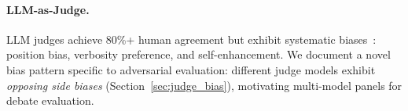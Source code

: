 \paragraph{LLM-as-Judge.}
LLM judges achieve 80\%+ human agreement but exhibit systematic
biases~\cite{zheng2023mtbench}: position bias, verbosity preference, and
self-enhancement. We document a novel bias pattern specific to adversarial
evaluation: different judge models exhibit \emph{opposing side biases}
(Section~\ref{sec:judge_bias}), motivating multi-model panels for debate
evaluation.
